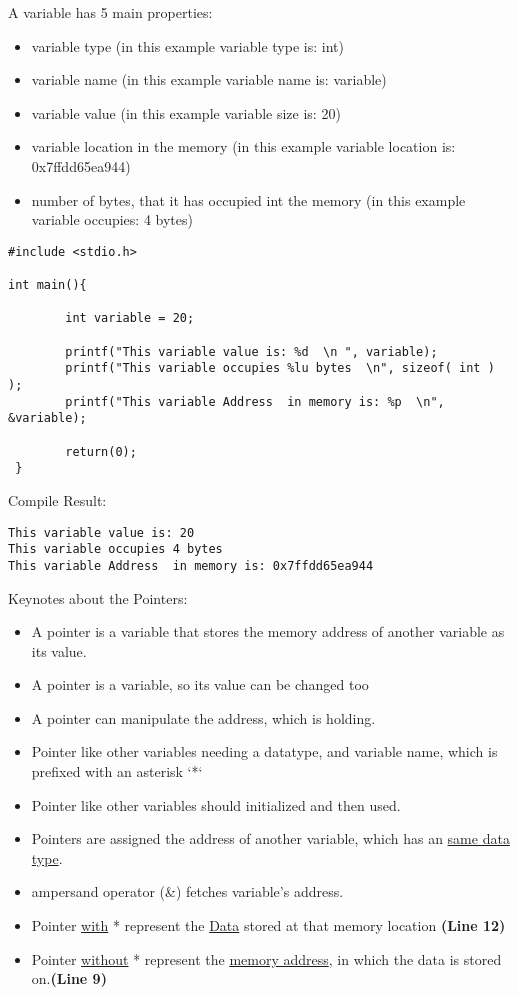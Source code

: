 A variable has 5 main properties:
\begin{itemize}
    \item variable type (in this example variable type is: int)
    \item variable name (in this example variable name is: variable)
    \item variable value (in this example variable size is: 20)
    \item variable location in the memory (in this example variable location is: 0x7ffdd65ea944)
    \item number of bytes, that it has occupied int the memory (in this example variable occupies: 4 bytes)
\end{itemize}

\begin{lstlisting} 
#include <stdio.h>

int main(){
        
        int variable = 20;

        printf("This variable value is: %d  \n ", variable);
        printf("This variable occupies %lu bytes  \n", sizeof( int ) );
        printf("This variable Address  in memory is: %p  \n", &variable);
       
        return(0);
 }
\end{lstlisting}


Compile Result:
\begin{lstlisting} 
This variable value is: 20
This variable occupies 4 bytes
This variable Address  in memory is: 0x7ffdd65ea944
\end{lstlisting}

Keynotes about the Pointers:
\begin{itemize}
    \item A pointer is a variable that stores the memory address of another variable as its value.
    \item A pointer is a variable, so its value can be changed too
    \item A pointer can manipulate the address, which is holding.
    \item Pointer like other variables needing a datatype, and variable name, which is prefixed with an asterisk `*`
    \item Pointer like other variables should initialized and then used.
    \item Pointers are assigned the address of another variable, which has an \underline{same data type}.
    \item ampersand operator (\&) fetches variable's address.
    \item Pointer \underline{with} * represent the \underline{Data} stored at that memory location \textbf{(Line 12)}
    \item Pointer \underline{without} * represent the \underline{memory address}, in which the data is stored on.\textbf{(Line 9)}
\end{itemize}

